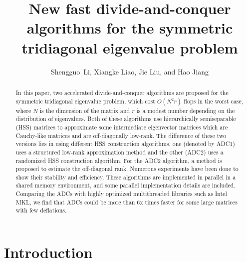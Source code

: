 \documentclass[times]{nlaauth}
\newcounter{algorithm}
\begin{document}

\title{New fast divide-and-conquer algorithms for the symmetric tridiagonal eigenvalue problem}


\author{Shengguo~Li\corrauth, Xiangke Liao, Jie Liu, and Hao Jiang}

\address{College of Computer Science, National University of Defense
  Technology, Changsha 410073, China}


\begin{abstract}
  In this paper, two accelerated divide-and-conquer algorithms are proposed for
  the symmetric tridiagonal eigenvalue problem, which cost $O(N^2r)$ {flops}
  in the worst case, where $N$ is the dimension of the matrix and $r$ is a modest number depending
  on the distribution of eigenvalues.
  Both of these algorithms use hierarchically semiseparable (HSS) matrices to approximate some
  intermediate eigenvector matrices which are Cauchy-like matrices and are off-diagonally low-rank.
  The difference of these two versions lies in using different HSS construction algorithms,
  one (denoted by {ADC1}) uses a structured low-rank approximation method
  and the other ({ADC2}) uses a randomized HSS construction algorithm.
  For the ADC2 algorithm, a method is proposed to estimate the off-diagonal rank.
  Numerous experiments have been done to show their stability and efficiency.
  These algorithms are implemented in parallel in a shared memory environment, and
  some parallel implementation details are included. Comparing the ADCs with
  highly optimized multithreaded libraries such as Intel MKL, we find that ADCs could be more than 6x times faster
  for some large matrices with few deflations.
\end{abstract}


\maketitle



\vspace{-6pt}

\section{Introduction}
\vspace{-2pt}
\end{document}
